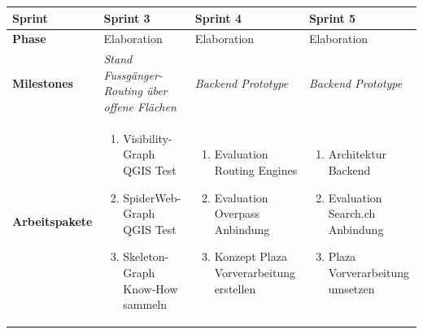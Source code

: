 \begin{landscape}
\begin{longtable}{l p{5.5cm} p{5.5cm} p{5.5cm}}
        \pagebreak
        \toprule
        \textbf{Sprint}
                                & \textbf{Sprint 3}
                                & \textbf{Sprint 4}
                                & \textbf{Sprint 5} \\
        
        \midrule
        \textbf{Phase}
                                & Elaboration
                                & Elaboration
                                & Elaboration \\
        
        \textbf{Milestones}
                                & \textit{Stand Fussgänger-Routing über offene Flächen}
                                & \textit{Backend Prototype}
                                & \textit{Backend Prototype}  \\
        
        \textbf{Arbeitspakete}
                                & \begin{enumerate}[noitemsep]
                                    \item Visibility-Graph QGIS Test
                                    \item SpiderWeb-Graph QGIS Test
                                    \item Skeleton-Graph Know-How sammeln
                                \end{enumerate}
                                & \begin{enumerate}[noitemsep]
                                    \item Evaluation Routing Engines
                                    \item Evaluation Overpass Anbindung
                                    \item Konzept Plaza Vorverarbeitung erstellen
                                \end{enumerate}
                                & \begin{enumerate}[noitemsep]
                                    \item Architektur Backend
                                    \item Evaluation Search.ch Anbindung
                                    \item Plaza Vorverarbeitung umsetzen
                                \end{enumerate}  \\
        

\end{longtable}
\end{landscape}
